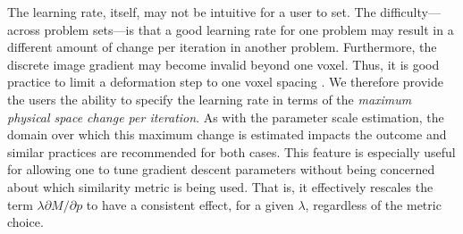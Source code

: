 \documentclass{frontiersSCNS}
\begin{document}
The learning rate, itself, may not be intuitive for a user to set.
The difficulty---across problem sets---is that a good learning rate for
one problem may result in a different amount of change per iteration
in another problem.  Furthermore, the discrete image gradient may
become invalid beyond one voxel.  Thus, it is good practice to limit a deformation step to one voxel spacing
\cite{Jenkinson2001}.  We therefore provide the users the ability to
specify the learning rate in terms of the {\em maximum physical space change
  per iteration}.  As with the parameter scale estimation, the domain
over which this maximum change is estimated impacts the outcome and
similar practices are recommended for both cases.   This feature is
especially useful for allowing one to tune gradient descent parameters
without being concerned about which similarity metric is being used.
That is, it effectively rescales the term $\lambda \partial M / \partial p$ to
have a consistent effect, for a given $\lambda$, regardless of the metric choice.
\end{document}
